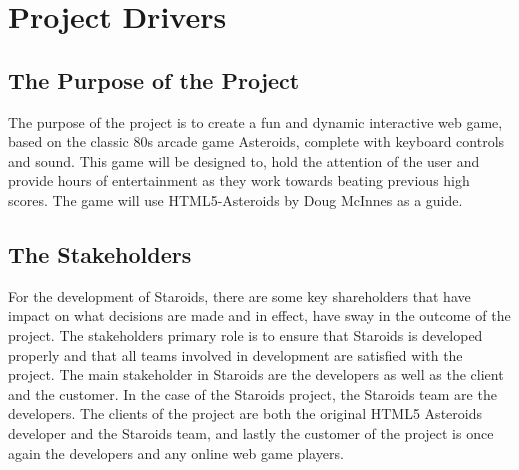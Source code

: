 \documentclass[12pt, titlepage]{article}
\begin{document}





\section{Project Drivers}

\subsection{The Purpose of the Project}
The purpose of the project is to create a fun and dynamic interactive web game, based on the classic 80s arcade game Asteroids, complete with keyboard controls and sound. This game will be designed to, hold the attention of the user and provide hours of entertainment as they work towards beating previous high scores. The game will use HTML5-Asteroids by Doug McInnes as a guide.\\

\subsection{The Stakeholders}
For the development of Staroids, there are some key shareholders that have impact on what decisions are made and in effect, have sway in the outcome of the project. The stakeholders primary role is to ensure that Staroids is developed properly and that all teams involved in development are satisfied with the project. The main stakeholder in Staroids are the developers as well as the client and the customer. In the case of the Staroids project, the Staroids team are the developers. The clients of the project are both the original HTML5 Asteroids developer and the Staroids team, and lastly the customer of the project is once again the developers and any online web game players.\\
\end{document}
